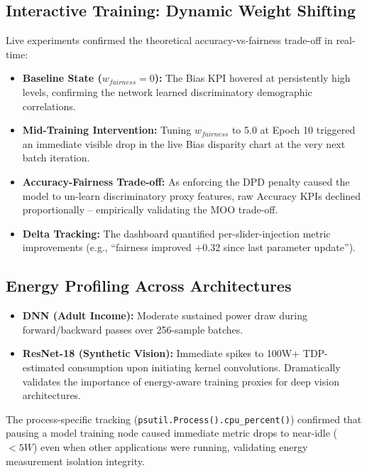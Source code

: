 \documentclass[12pt,a4paper]{article}
\begin{document}
\subsection{Interactive Training: Dynamic Weight Shifting}

Live experiments confirmed the theoretical accuracy-vs-fairness trade-off in real-time:

\begin{itemize}
    \item \textbf{Baseline State ($w_{fairness}=0$):} The Bias KPI hovered at persistently high levels, confirming the network learned discriminatory demographic correlations.
    \item \textbf{Mid-Training Intervention:} Tuning $w_{fairness}$ to 5.0 at Epoch 10 triggered an immediate visible drop in the live Bias disparity chart at the very next batch iteration.
    \item \textbf{Accuracy-Fairness Trade-off:} As enforcing the DPD penalty caused the model to un-learn discriminatory proxy features, raw Accuracy KPIs declined proportionally -- empirically validating the MOO trade-off.
    \item \textbf{Delta Tracking:} The dashboard quantified per-slider-injection metric improvements (e.g., ``fairness improved +0.32 since last parameter update'').
\end{itemize}

\subsection{Energy Profiling Across Architectures}

\begin{itemize}

    \item \textbf{DNN (Adult Income):} Moderate sustained power draw during forward/backward passes over 256-sample batches.
    \item \textbf{ResNet-18 (Synthetic Vision):} Immediate spikes to 100W+ TDP-estimated consumption upon initiating kernel convolutions. Dramatically validates the importance of energy-aware training proxies for deep vision architectures.
\end{itemize}

The process-specific tracking (\texttt{psutil.Process().cpu\_percent()}) confirmed that pausing a model training node caused immediate metric drops to near-idle ($<5W$) even when other applications were running, validating energy measurement isolation integrity.
\end{document}
